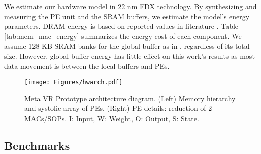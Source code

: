 We estimate our hardware model in 22 nm FDX technology. By synthesizing and measuring the PE unit and the SRAM buffers, we estimate the model's energy parameters. DRAM energy is based on reported values in literature \cite{Vogelsang2010UnderstandingMemories, Gao2017TETRIS, Cavigelli2017Origami:Accelerator, Jouppi2021TenProduct, stream}. Table \ref{tab:mem_mac_energy} summarizes the energy cost of each component. We assume 128 KB SRAM banks for the global buffer as in \cite{Sumbul2022System-LevelAvatars}, regardless of its total size. However, global buffer energy has little effect on this work's results as most data movement is between the local buffers and PEs.


\begin{figure}[t]
    \centering
    \texttt{[image: Figures/hwarch.pdf]}
    \caption{Meta VR Prototype \cite{Sumbul2022System-LevelAvatars} architecture diagram. (Left) Memory hierarchy and systolic array of PEs. (Right) PE details: reduction-of-2 MACs/SOPs. I: Input, W: Weight, O: Output, S: State.}
    \label{fig:meta_hw}
\end{figure}









\subsection{Benchmarks}


